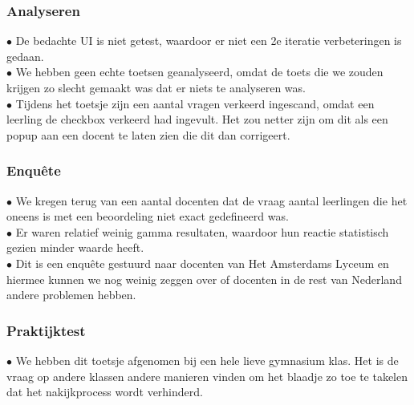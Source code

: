 \documentclass[12pt]{article}
\begin{document}
\begin{multicols}{2}
\subsubsection{Analyseren}
$\bullet$ De bedachte UI is niet getest, waardoor er niet een 2e iteratie verbeteringen is gedaan.\\
$\bullet$ We hebben geen echte toetsen geanalyseerd, omdat de toets die we zouden krijgen zo slecht gemaakt was dat er niets te analyseren was.\\
$\bullet$ Tijdens het toetsje zijn een aantal vragen verkeerd ingescand, omdat een leerling de checkbox verkeerd had ingevult. Het zou netter zijn om dit als een popup aan een docent te laten zien die dit dan corrigeert.\\
\begin{minipage}{\linewidth}
    
\subsubsection{Enquête}
$\bullet$ We kregen terug van een aantal docenten dat de vraag aantal leerlingen die het oneens is met een beoordeling niet exact gedefineerd was.\\
$\bullet$ Er waren relatief weinig gamma resultaten, waardoor hun reactie statistisch gezien minder waarde heeft.\\
$\bullet$ Dit is een enquête gestuurd naar docenten van Het Amsterdams Lyceum en hiermee kunnen we nog weinig zeggen over of docenten in de rest van Nederland andere problemen hebben.\\
\end{minipage}
\begin{minipage}{\linewidth}
\subsubsection{Praktijktest}
$\bullet$ We hebben dit toetsje afgenomen bij een hele lieve gymnasium klas. Het is de vraag op andere klassen andere manieren vinden om het blaadje zo toe te takelen dat het nakijkprocess wordt verhinderd.\\
\end{minipage}
\begin{minipage}{\linewidth}
    

\end{minipage}
\end{multicols}
\end{document}

